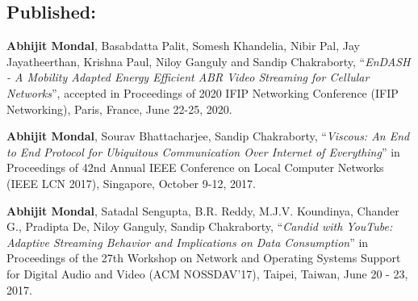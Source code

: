 \subsection*{Published:}
\begin{enumerate}[start=1,label={[\arabic*]}]
	\item \textbf{Abhijit Mondal}, Basabdatta Palit, Somesh Khandelia, Nibir Pal, Jay Jayatheerthan, Krishna Paul, Niloy Ganguly and Sandip Chakraborty, ``\textit{EnDASH - A Mobility Adapted Energy Efficient ABR Video Streaming for Cellular Networks}'', accepted in Proceedings of 2020 IFIP Networking Conference (IFIP Networking), Paris, France, June 22-25, 2020.
	\item \textbf{Abhijit Mondal}, Sourav Bhattacharjee, Sandip Chakraborty, ``\textit{Viscous: An End to End Protocol for Ubiquitous Communication Over Internet of Everything}'' in Proceedings of 42nd Annual IEEE Conference on Local Computer Networks (IEEE LCN 2017), Singapore, October 9-12, 2017.
	\item \textbf{Abhijit Mondal}, Satadal Sengupta, B.R. Reddy, M.J.V. Koundinya, Chander G., Pradipta De, Niloy Ganguly, Sandip Chakraborty, ``\textit{Candid with YouTube: Adaptive Streaming Behavior and Implications on Data Consumption}'' in Proceedings of the 27th Workshop on Network and Operating Systems Support for Digital Audio and Video (ACM NOSSDAV’17), Taipei, Taiwan, June 20 - 23, 2017.
\end{enumerate}